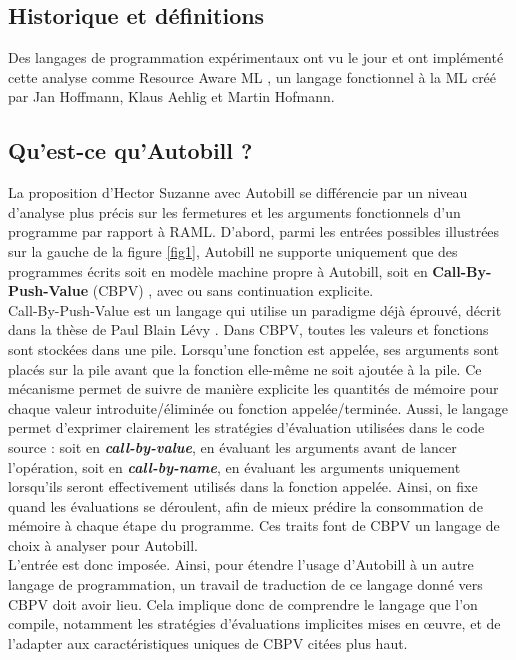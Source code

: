 \documentclass[12pt]{article}
\begin{document}
\subsection{Historique et définitions}\label{historique-et-duxe9finitions}
Des langages de programmation expérimentaux ont vu le jour et ont implémenté cette analyse comme Resource Aware ML \cite{RAML}, un langage fonctionnel à la ML créé par Jan Hoffmann, Klaus Aehlig et Martin Hofmann.

\hypertarget{quest-ce-quautobill}{%
      \subsection{Qu'est-ce qu'Autobill ?}\label{quest-ce-quautobill}}

La proposition d'Hector Suzanne avec Autobill se différencie par un
niveau d'analyse plus précis sur les fermetures et les arguments
fonctionnels d'un programme par rapport à RAML. D'abord, parmi les entrées possibles
illustrées sur la gauche de la figure \ref{fig1}, Autobill ne supporte
uniquement que des programmes écrits soit en modèle machine propre à
Autobill, soit en \textbf{Call-By-Push-Value} (CBPV)
\cite{Levy}, avec ou sans continuation
explicite. \\

Call-By-Push-Value est un langage qui utilise un paradigme déjà éprouvé,
décrit dans la thèse de Paul Blain Lévy
\cite{Levy}. Dans CBPV, toutes les valeurs et fonctions sont stockées dans une pile. Lorsqu'une fonction est appelée, ses arguments sont placés sur la pile avant que la fonction elle-même ne soit ajoutée à la pile. Ce mécanisme permet de suivre de manière explicite les quantités de mémoire pour chaque valeur introduite/éliminée ou fonction appelée/terminée. Aussi,
le langage permet d'exprimer clairement les stratégies d'évaluation utilisées dans le code source : soit en \textbf{\textit{call-by-value}}, en évaluant les arguments avant de lancer l'opération, soit en \textbf{\textit{call-by-name}}, en évaluant les arguments uniquement lorsqu’ils seront effectivement utilisés dans la fonction appelée. Ainsi, on fixe quand les évaluations se déroulent, afin de mieux prédire la consommation de mémoire à chaque
étape du programme. Ces traits font de CBPV un langage de choix à analyser pour Autobill. \\

L'entrée est donc imposée. Ainsi, pour étendre l'usage d'Autobill à un
autre langage de programmation, un travail de traduction de ce langage
donné vers CBPV doit avoir lieu. Cela implique donc de comprendre le
langage que l'on compile, notamment les stratégies d'évaluations
implicites mises en œuvre, et de l'adapter aux caractéristiques uniques
de CBPV citées plus haut. \\
\end{document}
